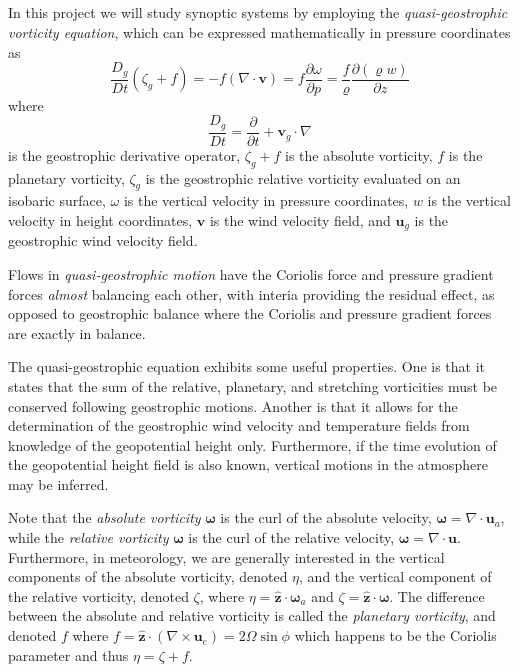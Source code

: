 \documentclass[11pt]{article}
\title{\spacedlowsmallcaps{\small 12.818: Introduction to Atmospheric Data and Large-scale Dynamics}\\ \spacedlowsmallcaps{\large Project seven: The Quasi-geostrophic Vorticity Equation}}
\author{\spacedlowsmallcaps{Ali Ramadhan}}
\date{}
\newcommand\p[2]{\frac{\partial #1}{\partial #2}}
\begin{document}
\maketitle

In this project we will study synoptic systems by employing the \emph{quasi-geostrophic vorticity equation}, which can be expressed mathematically in pressure coordinates as
\begin{equation*}
  \frac{D_g}{Dt}(\zeta_g + f) = -f (\nabla \cdot \bm{v}) = f\p{\omega}{p}
  = \frac{f}{\varrho} \p{(\varrho w)}{z}
\end{equation*}
where
\begin{equation*}
  \frac{D_g}{Dt} = \frac{\partial}{\partial t} + \bm{v}_g \cdot \nabla
\end{equation*}
is the geostrophic derivative operator, $\zeta_g + f$ is the absolute vorticity, $f$ is the planetary vorticity, $\zeta_g$ is the geostrophic relative vorticity evaluated on an isobaric surface, $\omega$ is the vertical velocity in pressure coordinates, $w$ is the vertical velocity in height coordinates, $\bm{v}$ is the wind velocity field, and $\bm{u}_g$ is the geostrophic wind velocity field.

Flows in \emph{quasi-geostrophic motion} have the Coriolis force and pressure  gradient forces \emph{almost} balancing each other, with interia providing the residual effect, as opposed to geostrophic balance where the Coriolis and pressure gradient forces are exactly in balance.

The quasi-geostrophic equation exhibits some useful properties. One is that it states that the sum of the relative, planetary, and stretching vorticities must be conserved following geostrophic motions. Another is that it allows for the determination of the geostrophic wind velocity and temperature fields from knowledge of the geopotential height only. Furthermore, if the time evolution of the geopotential height field is also known, vertical motions in the atmosphere may be inferred.

Note that the \emph{absolute vorticity} $\bm{\omega}$ is the curl of the absolute velocity, $\bm{\omega} = \nabla \cdot \bm{u}_a$, while the \emph{relative vorticity} $\bm{\omega}$ is the curl of the relative velocity, $\bm{\omega} = \nabla \cdot \bm{u}$. Furthermore, in meteorology, we are generally interested in the vertical components of the absolute vorticity, denoted $\eta$, and the vertical component of the relative vorticity, denoted $\zeta$, where $\eta = \hat{\bm{z}} \cdot \bm{\omega}_a$ and $\zeta = \hat{\bm{z}} \cdot \bm{\omega}$. The difference between the absolute and relative vorticity is called the \emph{planetary vorticity}, and denoted $f$ where $f = \hat{\bm{z}} \cdot (\nabla \times \bm{u}_e) = 2\Omega\sin\phi$ which happens to be the Coriolis parameter and thus $\eta = \zeta + f$.
\end{document}
